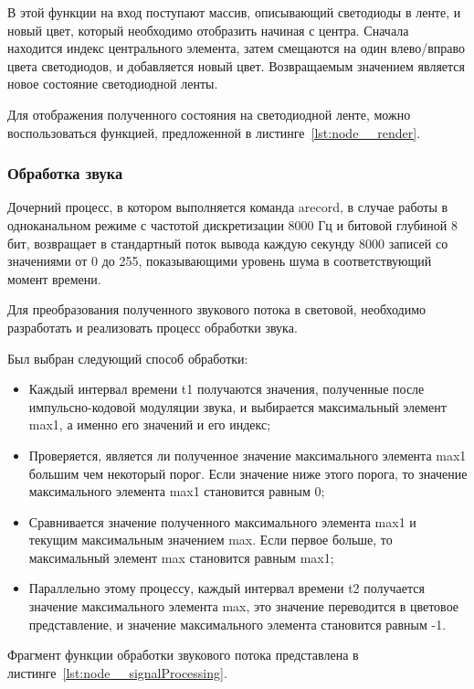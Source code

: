 

В этой функции на вход поступают массив, описывающий светодиоды в ленте, и новый цвет, который необходимо отобразить начиная с центра. Сначала находится индекс центрального элемента, затем смещаются на один влево/вправо цвета светодиодов, и добавляется новый цвет. Возвращаемым значением является новое состояние светодиодной ленты.

Для отображения полученного состояния на светодиодной ленте, можно воспользоваться функцией, предложенной в листинге~\ref{lst:node__render}.



\subsubsection{Обработка звука}

Дочерний процесс, в котором выполняется команда arecord, в случае работы в одноканальном режиме с частотой дискретизации 8000 Гц и битовой глубиной 8 бит, возвращает в стандартный поток вывода каждую секунду 8000 записей со значениями от 0 до 255, показывающими уровень шума в соответствующий момент времени.

Для преобразования полученного звукового потока в световой, необходимо разработать и реализовать процесс обработки звука.

Был выбран следующий способ обработки:

\begin{itemize}
  \item Каждый интервал времени t1 получаются значения, полученные после импульсно-кодовой модуляции звука, и выбирается максимальный элемент max1, а именно его значений и его индекс;
  \item Проверяется, является ли полученное значение максимального элемента max1 большим чем некоторый порог. Если значение ниже этого порога, то значение максимального элемента max1 становится равным 0;
  \item Сравнивается значение полученного максимального элемента max1 и текущим максимальным значением max. Если первое больше, то максимальный элемент max становится равным max1;
  \item Параллельно этому процессу, каждый интервал времени t2 получается значение максимального элемента max, это значение переводится в цветовое представление, и значение максимального элемента становится равным -1.
\end{itemize}

Фрагмент функции обработки звукового потока представлена в листинге~\ref{lst:node__signalProcessing}.




